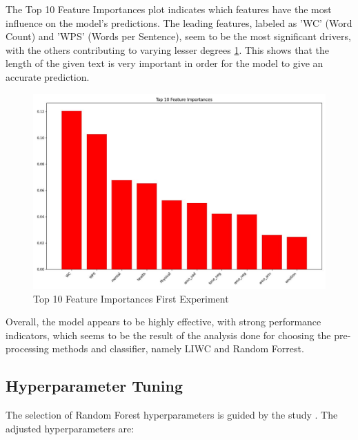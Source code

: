 \documentclass[3p,times,procedia]{elsarticle}
\begin{document}
The Top 10 Feature Importances plot indicates which features have the most influence on the model's predictions. The leading features, labeled as 'WC' (Word Count) and 'WPS' (Words per Sentence), seem to be the most significant drivers, with the others contributing to varying lesser degrees \ref{top10FeaturesFirstExperiment}. This shows that the length of the given text is very important in order for the model to give an accurate prediction.

\begin{figure}[htbp]
	\centering
		\includegraphics[scale=0.5]{./figures/metrics/experiment1English/top10features.jpg}
	\caption{Top 10 Feature Importances First Experiment}
	\label{top10FeaturesFirstExperiment}
\end{figure}

Overall, the model appears to be highly effective, with strong performance indicators, which seems to be the result of the analysis done for choosing the pre-processing methods and classifier, namely LIWC \cite{boyd2022development} and Random Forrest.

\subsection{Hyperparameter Tuning}
The selection of Random Forest hyperparameters is guided by the study \cite{probst2019hyperparameters}. The adjusted hyperparameters are:
\end{document}
